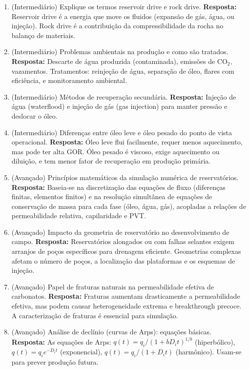 \documentclass[11pt,a4paper]{article}
\begin{document}
\begin{enumerate}
  \item (Intermediário) Explique os termos reservoir drive e rock drive.
  \textbf{Resposta:} Reservoir drive é a energia que move os fluidos (expansão de gás, água, ou injeção). Rock drive é a contribuição da compressibilidade da rocha no balanço de materiais.

  \item (Intermediário) Problemas ambientais na produção e como são tratados.
  \textbf{Resposta:} Descarte de água produzida (contaminada), emissões de CO$_2$, vazamentos. Tratamentos: reinjeção de água, separação de óleo, flares com eficiência, e monitoramento ambiental.

  \item (Intermediário) Métodos de recuperação secundária.
  \textbf{Resposta:} Injeção de água (waterflood) e injeção de gás (gas injection) para manter pressão e deslocar o óleo.

  \item (Intermediário) Diferenças entre óleo leve e óleo pesado do ponto de vista operacional.
  \textbf{Resposta:} Óleo leve flui facilmente, requer menos aquecimento, mas pode ter alta GOR. Óleo pesado é viscoso, exige aquecimento ou diluição, e tem menor fator de recuperação em produção primária.

  \item (Avançado) Princípios matemáticos da simulação numérica de reservatórios.
  \textbf{Resposta:} Baseia-se na discretização das equações de fluxo (diferenças finitas, elementos finitos) e na resolução simultânea de equações de conservação de massa para cada fase (óleo, água, gás), acopladas a relações de permeabilidade relativa, capilaridade e PVT.

  \item (Avançado) Impacto da geometria de reservatório no desenvolvimento de campo.
  \textbf{Resposta:} Reservatórios alongados ou com falhas selantes exigem arranjos de poços específicos para drenagem eficiente. Geometrias complexas afetam o número de poços, a localização das plataformas e os esquemas de injeção.

  \item (Avançado) Papel de fraturas naturais na permeabilidade efetiva de carbonatos.
  \textbf{Resposta:} Fraturas aumentam drasticamente a permeabilidade efetiva, mas podem causar heterogeneidade extrema e breakthrough precoce. A caracterização de fraturas é essencial para simulação.

  \item (Avançado) Análise de declínio (curvas de Arps): equações básicas.
  \textbf{Resposta:} As equações de Arps: $q(t) = q_i / (1 + b D_i t)^{1/b}$ (hiperbólico), $q(t) = q_i e^{-D_i t}$ (exponencial), $q(t) = q_i / (1 + D_i t)$ (harmônico). Usam-se para prever produção futura.


\end{enumerate}
\end{document}
